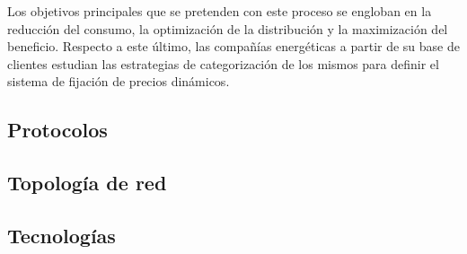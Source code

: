 \vspace{3mm}

Los objetivos principales que se pretenden con este proceso se engloban en la reducción del consumo, la optimización de la distribución y la maximización del beneficio. Respecto a este último, las compañías energéticas a partir de su base de clientes estudian las estrategias de categorización de los mismos para definir el sistema de fijación de precios dinámicos. 

\vspace{3mm}








\vspace{3mm}




















\subsection{Protocolos}





\subsection{Topología de red}



\subsection{Tecnologías}










